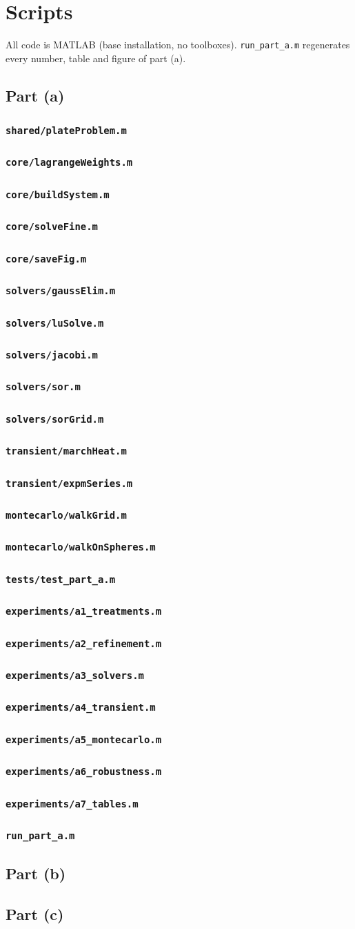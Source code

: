 \section{Scripts}

All code is MATLAB (base installation, no toolboxes). \texttt{run\_part\_a.m} regenerates every number, table and figure of
part (a).

\subsection{Part (a)}
\newcommand{\codefile}[2]{\subsubsection*{\texttt{#1}}}

\codefile{shared/plateProblem.m}{shared/plateProblem.m}
\codefile{core/lagrangeWeights.m}{part_a/core/lagrangeWeights.m}
\codefile{core/buildSystem.m}{part_a/core/buildSystem.m}
\codefile{core/solveFine.m}{part_a/core/solveFine.m}
\codefile{core/saveFig.m}{part_a/core/saveFig.m}
\codefile{solvers/gaussElim.m}{part_a/solvers/gaussElim.m}
\codefile{solvers/luSolve.m}{part_a/solvers/luSolve.m}
\codefile{solvers/jacobi.m}{part_a/solvers/jacobi.m}
\codefile{solvers/sor.m}{part_a/solvers/sor.m}
\codefile{solvers/sorGrid.m}{part_a/solvers/sorGrid.m}
\codefile{transient/marchHeat.m}{part_a/transient/marchHeat.m}
\codefile{transient/expmSeries.m}{part_a/transient/expmSeries.m}
\codefile{montecarlo/walkGrid.m}{part_a/montecarlo/walkGrid.m}
\codefile{montecarlo/walkOnSpheres.m}{part_a/montecarlo/walkOnSpheres.m}
\codefile{tests/test\_part\_a.m}{part_a/tests/test_part_a.m}
\codefile{experiments/a1\_treatments.m}{part_a/experiments/a1_treatments.m}
\codefile{experiments/a2\_refinement.m}{part_a/experiments/a2_refinement.m}
\codefile{experiments/a3\_solvers.m}{part_a/experiments/a3_solvers.m}
\codefile{experiments/a4\_transient.m}{part_a/experiments/a4_transient.m}
\codefile{experiments/a5\_montecarlo.m}{part_a/experiments/a5_montecarlo.m}
\codefile{experiments/a6\_robustness.m}{part_a/experiments/a6_robustness.m}
\codefile{experiments/a7\_tables.m}{part_a/experiments/a7_tables.m}
\codefile{run\_part\_a.m}{part_a/run_part_a.m}

\subsection{Part (b)}

\subsection{Part (c)}
